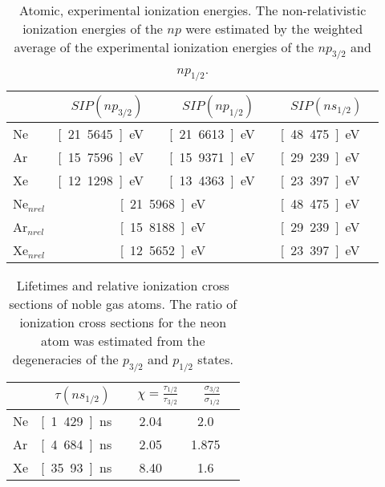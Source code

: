 \begin{appendix}
\begin{table}[h!]
 \caption{Atomic, experimental ionization energies.
          The non-relativistic ionization energies of the
          $np$ were estimated by the weighted average of the experimental
          ionization energies of the $np_{3/2}$ and $np_{1/2}$.}
 \centering
 \begin{tabular}{lcrcrcr}
  \bottomrule
     & \multicolumn{2}{c}{$SIP(np_{3/2})$} & \multicolumn{2}{c}{$SIP(np_{1/2})$} & \multicolumn{2}{c}{$SIP(ns_{1/2})$} \\
  \midrule
   Ne& \unit[21.5645]{eV} & \cite{NIST2014} & \unit[21.6613]{eV} & \cite{NIST2014} & \unit[48.475]{eV} & \cite{NIST2014}\\
   Ar& \unit[15.7596]{eV} & \cite{NIST2014} & \unit[15.9371]{eV} & \cite{NIST2014} & \unit[29.239]{eV} & \cite{NIST2014}\\
   Xe& \unit[12.1298]{eV} & \cite{NIST2014} & \unit[13.4363]{eV} & \cite{NIST2014} & \unit[23.397]{eV} & \cite{Lauer99} \\
  \midrule
   Ne$_{nrel}$ & \multicolumn{4}{c}{\unit[21.5968]{eV}} & \unit[48.475]{eV} &   \\
   Ar$_{nrel}$ & \multicolumn{4}{c}{\unit[15.8188]{eV}} & \unit[29.239]{eV} &   \\
   Xe$_{nrel}$ & \multicolumn{4}{c}{\unit[12.5652]{eV}} & \unit[23.397]{eV} &   \\
  \bottomrule
 \end{tabular}
 \label{table:noble_atom_ionization}
\end{table}

\begin{table}[h!]
 \caption{Lifetimes and relative ionization cross sections of
          noble gas atoms. The ratio of ionization cross sections for
          the neon atom was estimated from the degeneracies of the
          $p_{3/2}$ and $p_{1/2}$ states.}
 \centering
 \begin{tabular}{lcrcrcr}
  \toprule
      & \multicolumn{2}{c}{$\tau(ns_{1/2})$} & \multicolumn{2}{c}{$\chi=\frac{\tau_{1/2}}{\tau_{3/2}}$} & \multicolumn{2}{c}{$\frac{\sigma_{3/2}}{\sigma_{1/2}}$} \\
  \midrule
   Ne & \unit[1.429]{ns} & \cite{Lauer99} & 2.04 & \cite{Jans97} & 2.0   & \\
   Ar & \unit[4.684]{ns} & \cite{Lauer99} & 2.05 & \cite{Jans97} & 1.875 & \cite{Codling80} \\
   Xe & \unit[35.93]{ns} & \cite{Lauer99} & 8.40 & \cite{Luyken72} & 1.6 & \cite{Krause81} \\
  \bottomrule
 \end{tabular}
 \label{table:noble_atom_properties}
\end{table}


\end{appendix}
